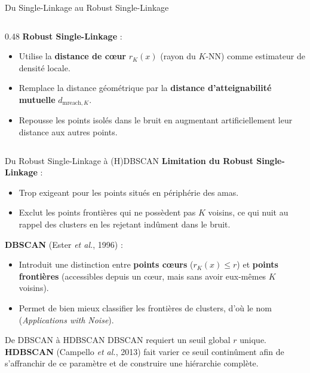 \documentclass[A4,svgnames,9pt,aspectratio=169]{beamer}
\begin{document}
\begin{frame}{Du Single-Linkage au Robust Single-Linkage}
\begin{columns}[c, onlytextwidth]
\begin{column}{0.48\textwidth}
            \vspace{0.4cm}
            \textbf{Robust Single-Linkage} \cite{RobustSingleLinkage2010} :
            \begin{itemize}
                \setlength{\itemsep}{6pt}
                \item Utilise la \textbf{distance de cœur} $r_K(x)$ (rayon du $K$-NN) comme estimateur de densité locale.
                \item Remplace la distance géométrique par la \textbf{distance d'atteignabilité mutuelle} $d_{\mathrm{mreach}, K}$.
                \item Repousse les points isolés dans le bruit en augmentant artificiellement leur distance aux autres points.
            \end{itemize}
        \end{column}
    \end{columns}
\end{frame}

\begin{frame}{Du Robust Single-Linkage à (H)DBSCAN}
    \textbf{Limitation du Robust Single-Linkage} :
    \begin{itemize}
        \setlength{\itemsep}{6pt}
        \item Trop exigeant pour les points situés en périphérie des amas.
        \item Exclut les points frontières qui ne possèdent pas $K$ voisins, ce qui nuit au rappel des clusters en les rejetant indûment dans le bruit.
    \end{itemize}
    
    \vspace{0.4cm}
    \textbf{DBSCAN} \cite{DBSCAN} (Ester \emph{et al.}, 1996) :
    \begin{itemize}
        \setlength{\itemsep}{6pt}
        \item Introduit une distinction entre \textbf{points cœurs} ($r_K(x) \le r$) et \textbf{points frontières} (accessibles depuis un cœur, mais sans avoir eux-mêmes $K$ voisins).
        \item Permet de bien mieux classifier les frontières de clusters, d'où le nom (\emph{Applications with Noise}).
    \end{itemize}
    
    \vspace{0.4cm}
    \begin{block}{De DBSCAN à HDBSCAN}
        DBSCAN requiert un seuil global $r$ unique. 
        \textbf{HDBSCAN} \cite{HDBSCAN} (Campello \emph{et al.}, 2013) fait varier ce seuil continûment afin de s'affranchir de ce paramètre et de construire une hiérarchie complète.
    \end{block}
\end{frame}
\end{document}
